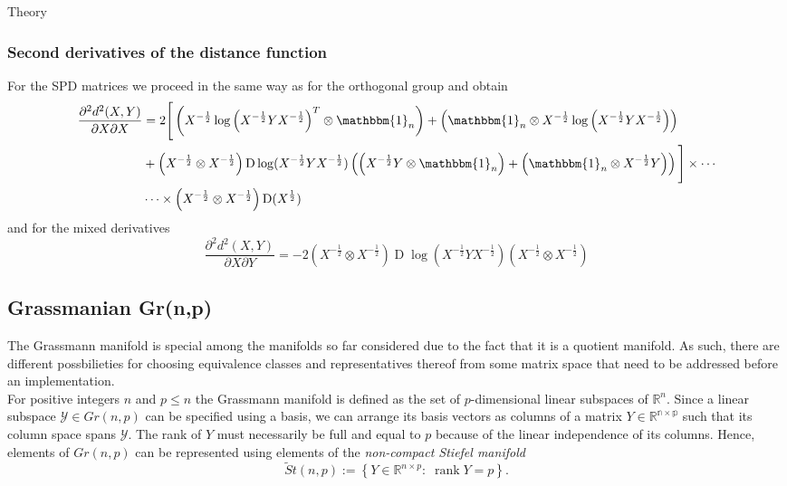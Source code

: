 \begin{chapter}{Theory}
\subsubsection{Second derivatives of the distance function} %
\label{ssub:Second derivatives of the distance function}
For the SPD matrices we proceed in the same way as for the orthogonal group and obtain
\begin{align}
    \label{eq:spd_xx_der}
    \frac{\partial^2 d^2(X,Y)}{\partial X\partial X} &= 
    2\Bigg[
	\left(X^{-\frac{1}{2}}\log\left(X^{-\frac{1}{2}}YX^{-\frac{1}{2}}\right)^T\otimes\mathbbm{1}_n\right)
	+\left(\mathbbm{1}_n\otimes X^{-\frac{1}{2}}\log\left(X^{-\frac{1}{2}}YX^{-\frac{1}{2}}\right)\right) \\
    &	+\left(X^{-\frac{1}{2}}\otimes X^{-\frac{1}{2}}\right)\operatorname{D}\log(X^{-\frac{1}{2}}YX^{-\frac{1}{2}})\left( \left(X^{-\frac{1}{2}}Y\otimes\mathbbm{1}_n\right)
	+ \left(\mathbbm{1}_n\otimes X^{-\frac{1}{2}}Y\right)\right) 
    \Bigg] \times\cdots \nonumber \\
    & \cdots\times\left(X^{-\frac{1}{2}}\otimes X^{-\frac{1}{2}}\right)\operatorname{D}(X^{\frac{1}{2}})\nonumber
\end{align}
and for the mixed derivatives
\begin{equation}
    \label{eq:spd_xy_der}
    \frac{\partial^2 d^2(X,Y)}{\partial X\partial Y} = -2\left(X^{-\frac{1}{2}}\otimes X^{-\frac{1}{2}}\right)\operatorname{D}\log\left(X^{-\frac{1}{2}}Y X^{-\frac{1}{2}}\right)\left(X^{-\frac{1}{2}}\otimes X^{-\frac{1}{2}}\right)
\end{equation}



\subsection{Grassmanian Gr(n,p)} %
\label{sub:Grassmanian}
The Grassmann manifold is special among the manifolds so far considered due to the fact that it is a quotient manifold. 
As such, there are different possbilieties for choosing equivalence classes and representatives thereof from some matrix space that need to be addressed
before an implementation.\\

For positive integers $n$ and $p\leq n$ the Grassmann manifold is defined as the set of $p$-dimensional linear subspaces of $\mathbb{R}^n$. 
Since a linear subspace $\mathcal{Y}\in Gr(n,p)$ can be specified using a basis, we can arrange its basis vectors as columns of
a matrix $Y\in\mathbb{R^{n\times p}}$ such that its column space spans $\mathcal{Y}$. The rank of $Y$ must necessarily be full and equal to $p$ because of the linear independence
of its columns. Hence, elements of $Gr(n,p)$ can be represented using elements of the \emph{non-compact Stiefel manifold}
\begin{equation}
    \tilde St(n,p) := \left\lbrace Y\in\mathbb{R}^{n\times p}:\; \operatorname{rank}Y=p\right\rbrace.
\end{equation}


\end{chapter}
